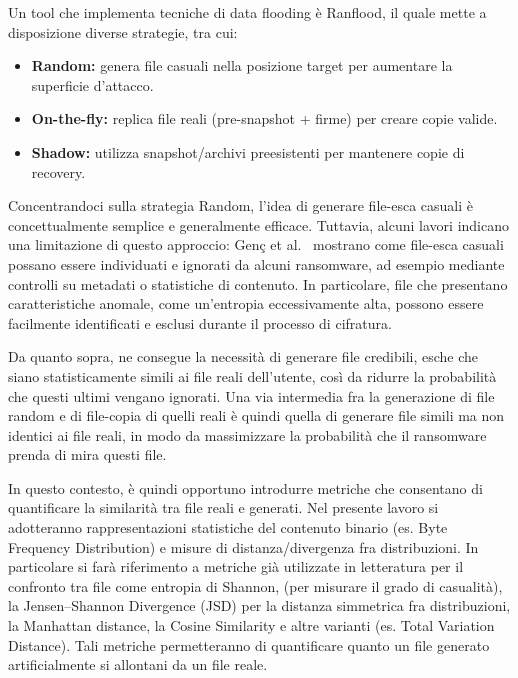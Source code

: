 \documentclass{report}
\begin{document}
\bigskip
Un tool che implementa tecniche di data flooding è Ranflood, il quale mette a disposizione diverse strategie, tra cui:
\begin{itemize}
  \item \textbf{Random:} genera file casuali nella posizione target per aumentare la superficie d'attacco.
  \item \textbf{On-the-fly:} replica file reali (pre-snapshot + firme) per creare copie valide.
  \item \textbf{Shadow:} utilizza snapshot/archivi preesistenti per mantenere copie di recovery.
\end{itemize} 

Concentrandoci sulla strategia Random, l'idea di generare file-esca casuali è concettualmente semplice e generalmente efficace. Tuttavia, alcuni lavori indicano una limitazione di questo approccio: Genç et al.~\cite{genc2019deception} mostrano come file-esca casuali possano essere individuati e ignorati da alcuni ransomware, ad esempio mediante controlli su metadati o statistiche di contenuto.
In particolare, file che presentano caratteristiche anomale, come un'entropia eccessivamente alta, possono essere facilmente identificati e esclusi durante il processo di cifratura.

\bigskip

Da quanto sopra, ne consegue la necessità di generare file credibili, esche che siano statisticamente simili ai file reali dell'utente, così da ridurre la probabilità che questi ultimi vengano ignorati.
Una via intermedia fra la generazione di file random e di file-copia di quelli reali è quindi quella di generare file simili ma non identici ai file reali, in modo da massimizzare la probabilità che il ransomware prenda di mira questi file.

\bigskip

In questo contesto, è quindi opportuno introdurre metriche che consentano di quantificare la similarità tra file reali e generati.
Nel presente lavoro si adotteranno rappresentazioni statistiche del contenuto binario (es. Byte Frequency Distribution) e misure di distanza/divergenza fra distribuzioni.
In particolare si farà riferimento a metriche già utilizzate in letteratura per il confronto tra file come entropia di Shannon, (per misurare il grado di casualità), la Jensen–Shannon Divergence (JSD) per la distanza simmetrica fra distribuzioni, la Manhattan distance, la Cosine Similarity e altre varianti (es. Total Variation Distance).
Tali metriche permetteranno di quantificare quanto un file generato artificialmente si allontani da un file reale.
\end{document}
